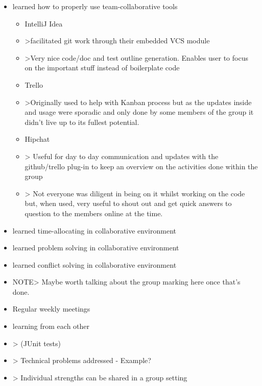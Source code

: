    \begin{itemize}
        \item learned how to properly use team-collaborative tools
		\begin{itemize}
                \item IntelliJ Idea
                \item >facilitated git work through their embedded VCS module
                \item >Very nice code/doc and test outline generation. Enables user to focus on the important stuff instead of boilerplate code
                \item Trello
                \item >Originally used to help with Kanban process but as the updates inside and usage were sporadic and only done by some members of the group it didn't live up to its fullest potential.
                \item Hipchat
                \item > Useful for day to day communication and updates with the github/trello plug-in to keep an overview on the activities done within the group
                \item > Not everyone was diligent in being on it whilst working on the code but, when used, very useful to shout out and get quick answers to question to the members online at the time.
         \end{itemize}
         
        \item learned time-allocating in collaborative environment
        \item learned  problem solving in collaborative environment
        \item learned  conflict solving in collaborative environment
        \item NOTE> Maybe worth talking about the group marking here once that's done.
        \item Regular weekly meetings
        \item learning from each other
        \item > (JUnit tests)
        \item > Technical problems addressed - Example?
        \item > Individual strengths can be shared in a group setting
    \end {itemize}
    
